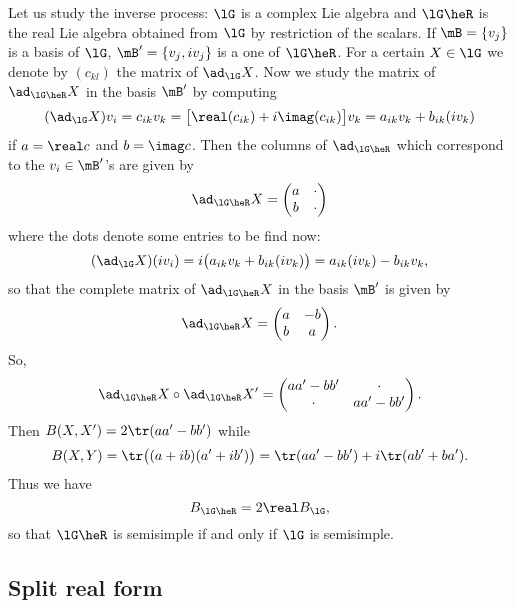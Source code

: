 Let us study the inverse process: $\lG$ is a complex Lie algebra and $\lG\heR$ is the real Lie algebra obtained from $\lG$ by restriction of the scalars. If $\mB=\{v_j\}$ is a basis of $\lG$, $\mB'=\{v_j,iv_j\}$ is a one of $\lG\heR$. For a certain $X\in\lG$ we denote by $(c_{kl})$ the matrix of $\ad_{\lG}X$. Now we study the matrix of $\ad_{\lG\heR}X$ in the basis $\mB'$ by computing
\begin{equation}
(\ad_{\lG}X)v_i=c_{ik}v_k
               =\big[ \real(c_{ik})+i\imag(c_{ik}) \big]v_k
           =a_{ik}v_k+b_{ik}(iv_k)
\end{equation}
if $a=\real c$ and $b=\imag c$. Then the columns of $\ad_{\lG\heR}$ which correspond to the $v_i\in\mB'$'s are given by
\[
\ad_{\lG\heR}X=\begin{pmatrix}
                 a&\cdot\\
         b&\cdot
               \end{pmatrix}
\]
where the dots denote some entries to be find now:
\begin{equation}
(\ad_{\lG}X)(iv_i)=i\big(  a_{ik}v_k+b_{ik}(iv_k)  \big)\\
                  =a_{ik}(iv_k)-b_{ik}v_k,
\end{equation}
so that the complete matrix of $\ad_{\lG\heR}X$ in the basis $\mB'$ is given by
\[
\ad_{\lG\heR}X=\begin{pmatrix}
                 a&-b\\
         b&a
               \end{pmatrix}.
\]
So,
\[
\ad_{\lG\heR}X\circ\ad_{\lG\heR}X'=\begin{pmatrix}
                 aa'-bb'&\cdot\\
         \cdot&aa'-bb'
               \end{pmatrix}.
\]
Then $B(X,X')=2\tr(aa'-bb')$ while
\begin{equation}
  B(X,Y)=\tr\big(  (a+ib)(a'+ib')  \big)\\
        =\tr(aa'-bb')+i\tr(ab'+ba').
\end{equation}
Thus we have
\begin{equation}
     B_{\lG\heR}=2\real B_{\lG},
\end{equation}
so that $\lG\heR$ is semisimple if and only if $\lG$ is semisimple.

\subsection{Split real form}

